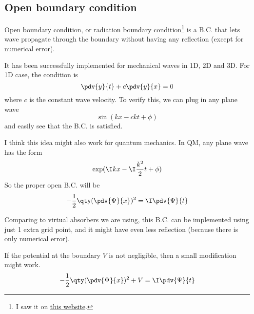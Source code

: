 
\subsection{Open boundary condition}

Open boundary condition, or radiation boundary condition\footnote{I saw it on \href{http://hplgit.github.io/num-methods-for-PDEs/doc/pub/wave/sphinx/._main_wave003.html#problem-11-implement-open-boundary-conditions}{this website}.} is a B.C. that lets wave propagate through the boundary without having any reflection (except for numerical error).

It has been successfully implemented for mechanical waves in 1D, 2D and 3D. For 1D case, the condition is
\begin{equation}
\pdv{y}{t} + c\pdv{y}{x} = 0
\end{equation}
where $c$ is the constant wave velocity. To verify this, we can plug in any plane wave
\begin{equation}
\sin(kx - ckt + \phi)
\end{equation}
and easily see that the B.C. is satisfied.

I think this idea might also work for quantum mechanics. In QM, any plane wave has the form
\begin{equation}
\exp(\I kx - \I \frac{k^2}{2}t + \phi)
\end{equation}
So the proper open B.C. will be
\begin{equation}
-\frac12 \qty(\pdv{\Psi}{x})^2 = \I \pdv{\Psi}{t}
\end{equation}

Comparing to virtual absorbers we are using, this B.C. can be implemented using just 1 extra grid point, and it might have even less reflection (because there is only numerical error).

If the potential at the boundary $V$ is not negligible, then a small modification might work.
\begin{equation}
-\frac12 \qty(\pdv{\Psi}{x})^2 + V = \I \pdv{\Psi}{t}
\end{equation}
